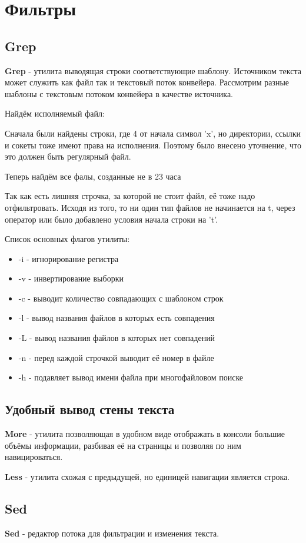 \documentclass[a4paper]{article}
\begin{document}
\section{Фильтры}

\subsection{Grep}
\textbf{Grep} - утилита выводящая строки соответствующие шаблону. Источником текста может служить как файл так и текстовый поток конвейера. Рассмотрим разные шаблоны с текстовым потоком конвейера в качестве источника.

Найдём исполняемый файл:

Сначала были найдены строки, где 4 от начала символ 'x', но директории, ссылки и сокеты тоже имеют права на исполнения. Поэтому было внесено уточнение, что это должен быть регулярный файл.

Теперь найдём все фалы, созданные не в 23 часа

Так как есть лишняя строчка, за которой не стоит файл, её тоже надо отфильтровать. Исходя из того, то ни один тип файлов не начинается на t, через оператор или было добавлено условия начала строки на 't'.

Список основных флагов утилиты:
\begin{itemize}
\item -i - игнорирование регистра
\item -v - инвертирование выборки
\item -c - выводит количество совпадающих с шаблоном строк
\item -l - вывод названия файлов в которых есть совпадения
\item -L - вывод названия файлов в которых нет совпадений
\item -n - перед каждой строчкой выводит её номер в файле
\item -h - подавляет вывод имени файла при многофайловом поиске
\end{itemize}
\subsection{ Удобный вывод стены текста}  
\textbf{More} - утилита позволяющая в удобном виде отображать в консоли большие объёмы информации, разбивая её на страницы и позволяя по ним навицироваться.

\textbf{Less} - утилита схожая с предыдущей, но единицей навигации является строка.
\subsection{Sed}
\textbf{Sed} - редактор потока для фильтрации и изменения текста.
\end{document}
